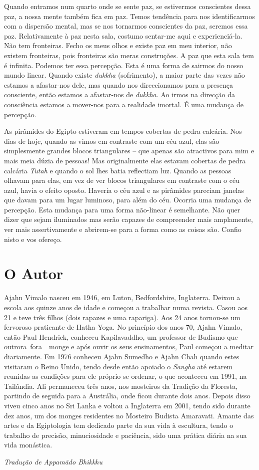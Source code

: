 Quando entramos num quarto onde se sente paz, se estivermos conscientes
dessa paz, a nossa mente também fica em paz. Temos tendência para nos
identificarmos com a dispersão mental, mas se nos tornarmos conscientes
da paz, seremos essa paz. Relativamente à paz nesta sala, costumo
sentar-me aqui e experienciá-la. Não tem fronteiras. Fecho os meus olhos
e existe paz em meu interior, não existem fronteiras, pois fronteiras
são meras construções. A paz que esta sala tem é infinita. Podemos ter
essa percepção. Esta é uma forma de sairmos do nosso mundo linear.
Quando existe \emph{dukkha} (sofrimento), a maior parte das vezes não
estamos a afastar-nos dele, mas quando nos direccionamos para a presença
consciente, então estamos a afastar-nos de \emph{dukkha}. Ao irmos na
direcção da consciência estamos a mover-nos para a realidade imortal. É
uma mudança de percepção.

As pirâmides do Egipto estiveram em tempos cobertas de pedra calcária.
Nos dias de hoje, quando as vimos em contraste com um céu azul, elas são
simplesmente grandes blocos triangulares -- que apenas são atractivos
para mim e mais meia dúzia de pessoas! Mas originalmente elas estavam
cobertas de pedra calcária \emph{Tutah} e quando o sol lhes batia
reflectiam luz. Quando as pessoas olhavam para elas, em vez de ver
blocos triangulares em contraste com o céu azul, havia o efeito oposto.
Haveria o céu azul e as pirâmides pareciam janelas que davam para um
lugar luminoso, para além do céu. Ocorria uma mudança de percepção. Esta
mudança para uma forma não-linear é semelhante. Não quer dizer que sejam
iluminados mas serão capazes de compreender mais amplamente, ver mais
assertivamente e abrirem-se para a forma como as coisas são. Confio
nisto e vos ofereço.

\section{O Autor}
 
Ajahn Vimalo nasceu em 1946, em Luton, Bedfordshire, Inglaterra. Deixou
a escola aos quinze anos de idade e começou a trabalhar numa revista.
Casou aos 21 e teve três filhos (dois rapazes e uma rapariga). Aos 24
anos tornou-se um fervoroso praticante de Hatha Yoga. No princípio dos
anos 70, Ajahn Vimalo, então Paul Hendrick, conheceu Kapilavaddho, um
professor de Budismo que outrora~fora~~monge e após ouvir os seus
ensinamentos, Paul começou a meditar diariamente. Em 1976 conheceu Ajahn
Sumedho e Ajahn Chah quando estes visitaram o Reino Unido, tendo desde
então apoiado o \emph{Sangha} até estarem reunidas as condições para ele
próprio se ordenar, o que aconteceu em 1991, na Tailândia. Ali
permaneceu três anos, nos mosteiros da Tradição da Floresta, partindo de
seguida para a Austrália, onde ficou durante dois anos. Depois disso
viveu cinco anos no Sri Lanka e voltou a Inglaterra em 2001, tendo sido
durante dez anos, um dos monges residentes no Mosteiro Budista
Amaravati. Amante das artes e da Egiptologia tem dedicado parte da sua
vida à escultura, tendo o trabalho de precisão, minuciosidade e
paciência, sido uma prática diária na sua vida monástica.

\bigskip

{\raggedleft\itshape
  Tradução de Appamādo Bhikkhu
\par}

